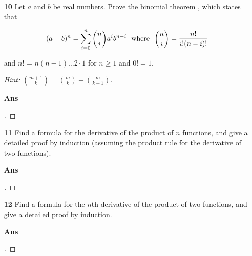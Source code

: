 \documentclass[paper=usletter, fontsize=12pt]{article}
\begin{document}
\begin{itemize}
\begin{itemize}
\begin{enumerate}
            \end{enumerate}

            \item[\textbf{10}] Let $a$ and $b$ be real numbers. Prove the
            binomial theorem , which states that

                \[ (a+b)^n = \sum_{i=0}^{n} \binom{n}{i}a^{i}b^{n-i} \text{\ \
                where \ } \binom{n}{i}=\frac{n!}{i!(n-i)!} \]

            and $n!$ = $n(n-1)\ldots 2 \cdot 1$ for $n \ge 1$ and $0! = 1$.

            \textit{Hint:} $\binom{m+1}{k}=\binom{m}{k}+\binom{m}{k-1}$.
            \item[\textbf{Ans}]
            \begin{proof}[\unskip\nopunct]
            \end{proof}
            \vspace{0.2in}

            \item[\textbf{11}] Find a formula for the derivative of the product
            of $n$ functions, and give a detailed proof by induction (assuming
            the product rule for the derivative of two functions).
            \item[\textbf{Ans}]
            \begin{proof}[\unskip\nopunct]
            \end{proof}
            \vspace{0.2in}

            \item[\textbf{12}] Find a formula for the $n$th derivative of the
            product of two functions, and give a detailed proof by induction.
            \item[\textbf{Ans}]
            \begin{proof}[\unskip\nopunct]
            \end{proof}
            \vspace{0.2in}

        \end{itemize}

    \end{itemize}
\end{document}

